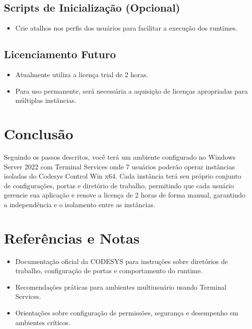 \documentclass[12pt,a4paper]{article}
\begin{document}
\subsection*{Scripts de Inicialização (Opcional)}
\begin{itemize}[label=\textbullet]
  \item Crie atalhos nos perfis dos usuários para facilitar a execução dos runtimes.
\end{itemize}

\subsection*{Licenciamento Futuro}
\begin{itemize}[label=\textbullet]
  \item Atualmente utiliza a licença trial de 2 horas.
  \item Para uso permanente, será necessária a aquisição de licenças apropriadas para múltiplas instâncias.
\end{itemize}

\section{Conclusão}
Seguindo os passos descritos, você terá um ambiente configurado no Windows Server 2022 com Terminal Services onde 7 usuários poderão operar instâncias isoladas do Codesys Control Win x64. Cada instância terá seu próprio conjunto de configurações, portas e diretório de trabalho, permitindo que cada usuário gerencie sua aplicação e renove a licença de 2 horas de forma manual, garantindo a independência e o isolamento entre as instâncias.

\section*{Referências e Notas}
\begin{itemize}[label=\textbullet]
  \item Documentação oficial da CODESYS para instruções sobre diretórios de trabalho, configuração de portas e comportamento do runtime.
  \item Recomendações práticas para ambientes multiusuário usando Terminal Services.
  \item Orientações sobre configuração de permissões, segurança e desempenho em ambientes críticos.
\end{itemize}
\end{document}
